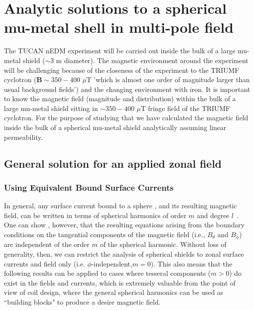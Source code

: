 
\chapter{Analytic solutions to a spherical mu-metal shell in multi-pole field}

The TUCAN nEDM experiment will be carried out inside the bulk
of a large mu-metal shield ($\sim 3$ m diameter). The magnetic environment around the experiment will be challenging because of the closeness of the experiment to the TRIUMF cyclotron ($\bm{B}\sim 350 - 400$ $\mu$T 'which is almost one order of magnitude larger than usual background fields') and the changing environment with iron. It is important to know the magnetic field (magnitude and distribution) within the bulk of a large mu-metal shield sitting in $\sim 350 - 400$ $\mu$T 
fringe field of the TRIUMF cyclotron. For the purpose of studying that we have calculated the magnetic field inside the bulk of a spherical mu-metal shield analytically assuming linear permeability.


\section{General solution for an applied zonal field}
\subsection{Using Equivalent Bound Surface Currents}

In general, any surface current bound to a sphere , and its resulting magnetic field, can be written in terms of spherical harmonics of order $m$ and degree $l$~\cite{CB1, smythe}. One can show , however, that the resulting equations arising from the boundary conditions on the tangential components of the magnetic field (i.e., $B_\theta$  and $B_\phi$) are independent of the order $m$ of the spherical harmonic. Without loss of generality, then, we can restrict the analysis of spherical shields to zonal surface currents and field only (i.e. $\phi$-independent,$m=0$). This also means that the following results can be applied to cases where tesseral components ($m > 0$) do exist in the fields and currents, which is extremely valuable from the point of view of coil design, where the general spherical harmonics can be used as ``building blocks" to produce a desire magnetic field.

